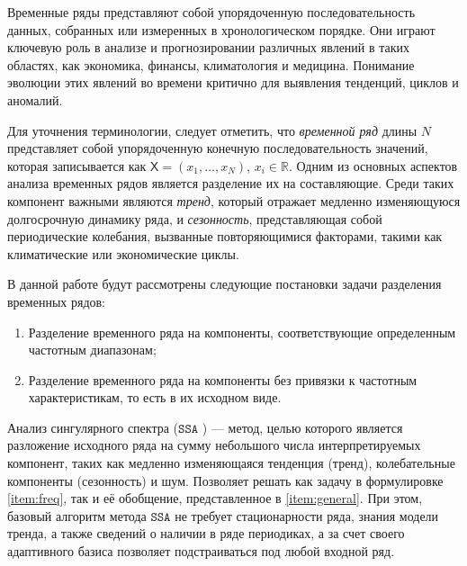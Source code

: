 \documentclass[12pt, specialist, subf
]{disser}
\date{}
\theoremstyle{definition}
\newcommand{\SSA}{\texttt{SSA}}
\newcommand{\TS}{\mathsf{X}}
\begin{document}
%


\tableofcontents
\noindent

\newpage


\intro


Временные ряды представляют собой упорядоченную последовательность данных, собранных или измеренных в хронологическом порядке. Они играют ключевую роль в анализе и прогнозировании различных явлений в таких областях, как экономика, финансы, климатология и медицина. Понимание эволюции этих явлений во времени критично для выявления тенденций, циклов и аномалий.

Для уточнения терминологии, следует отметить, что \textit{временной ряд} длины \( N \) представляет собой упорядоченную конечную последовательность значений, которая записывается как \( \TS = (x_1, \dots, x_{N}) \), $x_i \in \mathbb{R}$. Одним из основных аспектов анализа временных рядов является разделение их на составляющие. Среди таких компонент важными являются \textit{тренд}, который отражает медленно изменяющуюся долгосрочную динамику ряда, и \textit{сезонность}, представляющая собой периодические колебания, вызванные повторяющимися факторами, такими как климатические или экономические циклы.


В данной работе будут рассмотрены следующие постановки задачи разделения временных рядов:
\begin{enumerate}
	\item \label{item:freq} Разделение временного ряда на компоненты, соответствующие определенным частотным диапазонам;
	\item \label{item:general} Разделение временного ряда на компоненты без привязки к частотным характеристикам, то есть в их исходном виде.
\end{enumerate}


Анализ сингулярного спектра ($\SSA$ \cite{golyandina2001analysis}) --- метод, целью которого является разложение исходного ряда на сумму небольшого числа интерпретируемых компонент, таких как медленно изменяющаяся тенденция (тренд), колебательные компоненты (сезонность) и шум. Позволяет решать как задачу в формулировке \ref{item:freq}, так и её обобщение, представленное в \ref{item:general}. При этом, базовый алгоритм метода $\SSA$ не требует стационарности ряда, знания модели тренда, а также сведений о наличии в ряде периодиках, а за счет своего адаптивного базиса позволяет подстраиваться под любой входной ряд.
\end{document}
